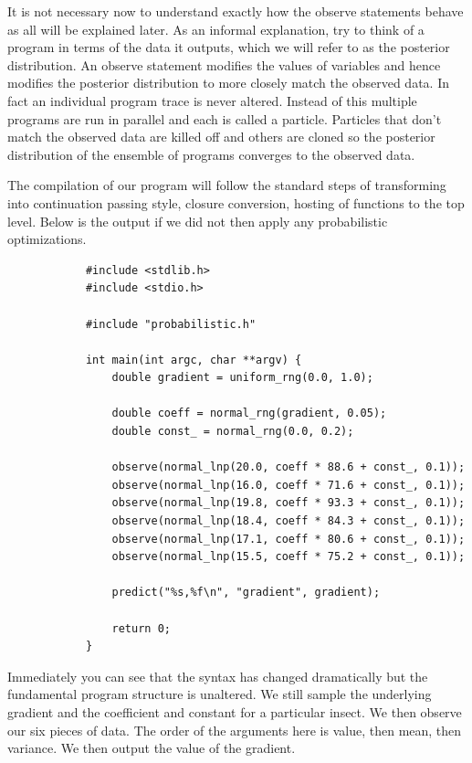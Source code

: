 \documentclass[a4paper]{article}
\begin{document}
It is not necessary now to understand exactly how the observe statements behave as all will be explained later. As an informal explanation, try to think of a program in terms of the data it outputs, which we will refer to as the posterior distribution. An observe statement modifies the values of variables and hence modifies the posterior distribution to more closely match the observed data. In fact an individual program trace is never altered. Instead of this multiple programs are run in parallel and each is called a particle. Particles that don't match the observed data are killed off and others are cloned so the posterior distribution of the ensemble of programs converges to the observed data.

The compilation of our program will follow the standard steps of transforming into continuation passing style, closure conversion, hosting of functions to the top level. Below is the output if we did not then apply any probabilistic optimizations.

\begin{center}
	\begin{varwidth}{\linewidth}
		\small
		\begin{verbatim}
			#include <stdlib.h>
			#include <stdio.h>

			#include "probabilistic.h"

			int main(int argc, char **argv) {
			    double gradient = uniform_rng(0.0, 1.0);

			    double coeff = normal_rng(gradient, 0.05);
			    double const_ = normal_rng(0.0, 0.2);

			    observe(normal_lnp(20.0, coeff * 88.6 + const_, 0.1));
			    observe(normal_lnp(16.0, coeff * 71.6 + const_, 0.1));
			    observe(normal_lnp(19.8, coeff * 93.3 + const_, 0.1));
			    observe(normal_lnp(18.4, coeff * 84.3 + const_, 0.1));
			    observe(normal_lnp(17.1, coeff * 80.6 + const_, 0.1));
			    observe(normal_lnp(15.5, coeff * 75.2 + const_, 0.1));

			    predict("%s,%f\n", "gradient", gradient);

			    return 0;
			}
		\end{verbatim}
	\end{varwidth}
\end{center}
Immediately you can see that the syntax has changed dramatically but the fundamental program structure is unaltered. We still sample the underlying gradient and the coefficient and constant for a particular insect. We then observe our six pieces of data. The order of the arguments here is value, then mean, then variance. We then output the value of the gradient.
\end{document}
